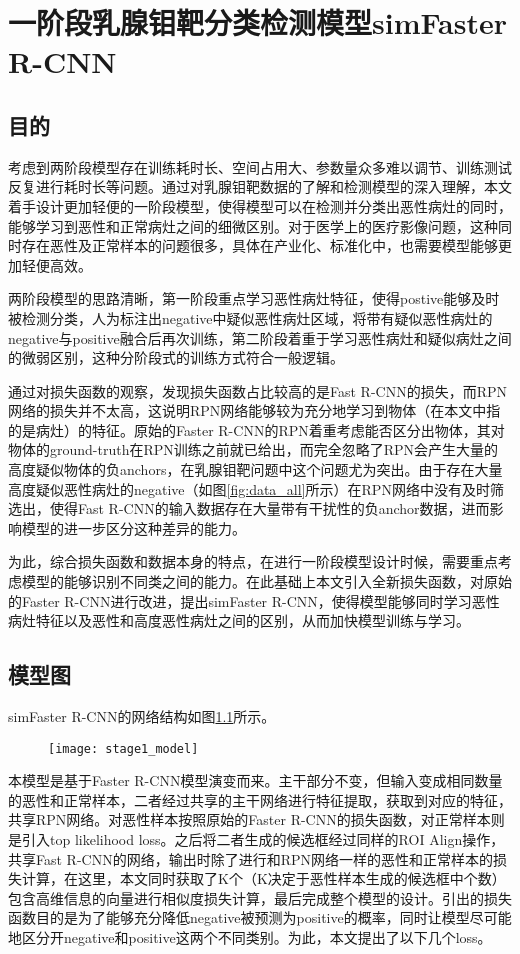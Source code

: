 \chapter{一阶段乳腺钼靶分类检测模型simFaster R-CNN}\label{chap:stage1}
\section{目的}
考虑到两阶段模型存在训练耗时长、空间占用大、参数量众多难以调节、训练测试反复进行耗时长等问题。通过对乳腺钼靶数据的了解和检测模型的深入理解，本文着手设计更加轻便的一阶段模型，使得模型可以在检测并分类出恶性病灶的同时，能够学习到恶性和正常病灶之间的细微区别。对于医学上的医疗影像问题，这种同时存在恶性及正常样本的问题很多，具体在产业化、标准化中，也需要模型能够更加轻便高效。

两阶段模型的思路清晰，第一阶段重点学习恶性病灶特征，使得postive能够及时被检测分类，人为标注出negative中疑似恶性病灶区域，将带有疑似恶性病灶的negative与positive融合后再次训练，第二阶段着重于学习恶性病灶和疑似病灶之间的微弱区别，这种分阶段式的训练方式符合一般逻辑。

通过对损失函数的观察，发现损失函数占比较高的是Fast R-CNN的损失，而RPN网络的损失并不太高，这说明RPN网络能够较为充分地学习到物体（在本文中指的是病灶）的特征。原始的Faster R-CNN的RPN着重考虑能否区分出物体，其对物体的ground-truth在RPN训练之前就已给出，而完全忽略了RPN会产生大量的高度疑似物体的负anchors，在乳腺钼靶问题中这个问题尤为突出。由于存在大量高度疑似恶性病灶的negative（如图\ref{fig:data_all}所示）在RPN网络中没有及时筛选出，使得Fast R-CNN的输入数据存在大量带有干扰性的负anchor数据，进而影响模型的进一步区分这种差异的能力。

为此，综合损失函数和数据本身的特点，在进行一阶段模型设计时候，需要重点考虑模型的能够识别不同类之间的能力。在此基础上本文引入全新损失函数，对原始的Faster R-CNN进行改进，提出simFaster R-CNN，使得模型能够同时学习恶性病灶特征以及恶性和高度恶性病灶之间的区别，从而加快模型训练与学习。

\section{模型图}
simFaster R-CNN的网络结构如图\ref{fig:stage1_model}所示。
\begin{figure}[!htbp]
    \centering
    \texttt{[image: stage1\_model]}
    \label{fig:stage1_model}
\end{figure}

本模型是基于Faster R-CNN模型演变而来。主干部分不变，但输入变成相同数量的恶性和正常样本，二者经过共享的主干网络进行特征提取，获取到对应的特征，共享RPN网络。对恶性样本按照原始的Faster R-CNN的损失函数，对正常样本则是引入top likelihood loss。之后将二者生成的候选框经过同样的ROI Align操作，共享Fast R-CNN的网络，输出时除了进行和RPN网络一样的恶性和正常样本的损失计算，在这里，本文同时获取了K个（K决定于恶性样本生成的候选框中个数）包含高维信息的向量进行相似度损失计算，最后完成整个模型的设计。引出的损失函数目的是为了能够充分降低negative被预测为positive的概率，同时让模型尽可能地区分开negative和positive这两个不同类别。为此，本文提出了以下几个loss。
